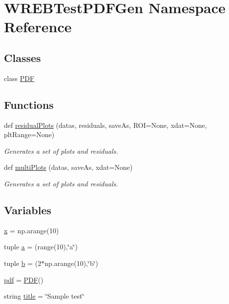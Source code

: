\hypertarget{namespace_w_r_e_b_test_p_d_f_gen}{}\section{W\+R\+E\+B\+Test\+P\+D\+F\+Gen Namespace Reference}
\label{namespace_w_r_e_b_test_p_d_f_gen}
\subsection*{Classes}
\begin{DoxyCompactItemize}
\item 
class \hyperlink{class_w_r_e_b_test_p_d_f_gen_1_1_p_d_f}{P\+DF}
\end{DoxyCompactItemize}
\subsection*{Functions}
\begin{DoxyCompactItemize}
\item 
def \hyperlink{namespace_w_r_e_b_test_p_d_f_gen_af064bd7841d8de40221ffc860bf594ff}{residual\+Plots} (datas, residuals, save\+As, R\+OI=None, xdat=None, plt\+Range=None)
\begin{DoxyCompactList}\small\item\em Generates a set of plots and residuals. \end{DoxyCompactList}\item 
def \hyperlink{namespace_w_r_e_b_test_p_d_f_gen_acd43e3fb768bba155474a50165c7e259}{multi\+Plots} (datas, save\+As, xdat=None)
\begin{DoxyCompactList}\small\item\em Generates a set of plots and residuals. \end{DoxyCompactList}\end{DoxyCompactItemize}
\subsection*{Variables}
\begin{DoxyCompactItemize}
\item 
\hyperlink{namespace_w_r_e_b_test_p_d_f_gen_a8ca66897d8a913ee8a2144675314591b}{x} = np.\+arange(10)
\item 
tuple \hyperlink{namespace_w_r_e_b_test_p_d_f_gen_ab4374e5266c2f724fd7a3a7878e6fcaa}{a} = (range(10),\char`\"{}a\char`\"{})
\item 
tuple \hyperlink{namespace_w_r_e_b_test_p_d_f_gen_aef838e878ef1e565abfec7795aa8a5f8}{b} = (2$\ast$np.\+arange(10),\char`\"{}b\char`\"{})
\item 
\hyperlink{namespace_w_r_e_b_test_p_d_f_gen_a64363c505fb5c374377e1adc4dc5a1dd}{pdf} = \hyperlink{class_w_r_e_b_test_p_d_f_gen_1_1_p_d_f}{P\+DF}()
\item 
string \hyperlink{namespace_w_r_e_b_test_p_d_f_gen_ae72a383e54deb3fda5db73aaf0c505e6}{title} = \char`\"{}Sample test\char`\"{}
\end{DoxyCompactItemize}


